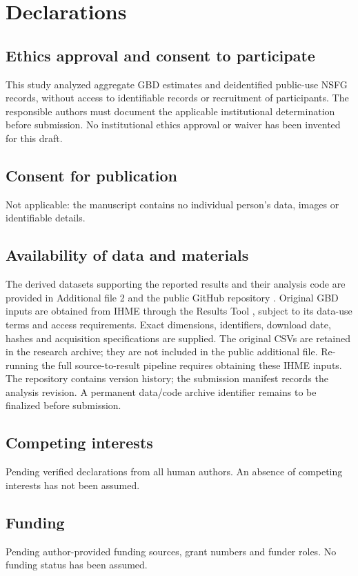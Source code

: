 \documentclass[11pt,a4paper]{article}
\begin{document}
\section*{Declarations}
\subsection*{Ethics approval and consent to participate}
This study analyzed aggregate GBD estimates and deidentified public-use NSFG records, without access to identifiable records or recruitment of participants. The responsible authors must document the applicable institutional determination before submission. No institutional ethics approval or waiver has been invented for this draft.
\subsection*{Consent for publication}
Not applicable: the manuscript contains no individual person's data, images or identifiable details.
\subsection*{Availability of data and materials}
The derived datasets supporting the reported results and their analysis code are provided in Additional file 2 and the public GitHub repository \cite{repository}. Original GBD inputs are obtained from IHME through the Results Tool \cite{results}, subject to its data-use terms and access requirements. Exact dimensions, identifiers, download date, hashes and acquisition specifications are supplied. The original CSVs are retained in the research archive; they are not included in the public additional file. Re-running the full source-to-result pipeline requires obtaining these IHME inputs. The repository contains version history; the submission manifest records the analysis revision. A permanent data/code archive identifier remains to be finalized before submission.
\subsection*{Competing interests}
Pending verified declarations from all human authors. An absence of competing interests has not been assumed.
\subsection*{Funding}
Pending author-provided funding sources, grant numbers and funder roles. No funding status has been assumed.
\end{document}
